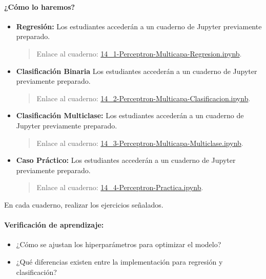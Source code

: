 \documentclass[a4,11pt]{aleph-notas}
\begin{document}
\paragraph{¿Cómo lo haremos?}  
\begin{itemize}[leftmargin=*]
    \item \textbf{Regresión:} Los estudiantes accederán a un cuaderno de Jupyter previamente preparado.
    \begin{quote}
        Enlace al cuaderno: \href{https://colab.research.google.com/github/andres-merino/AprendizajeAutomaticoInicial-05-N0105/blob/main/2-Notebooks/14_1-Perceptron-Multicapa-Regresion.ipynb}{14\_1-Perceptron-Multicapa-Regresion.ipynb}.
    \end{quote}
    \item \textbf{Clasificación Binaria} Los estudiantes accederán a un cuaderno de Jupyter previamente preparado.
    \begin{quote}
        Enlace al cuaderno: \href{https://colab.research.google.com/github/andres-merino/AprendizajeAutomaticoInicial-05-N0105/blob/main/2-Notebooks/14_2-Perceptron-Multicapa-Clasificacion.ipynb}{14\_2-Perceptron-Multicapa-Clasificacion.ipynb}.
    \end{quote}
    \item \textbf{Clasificación Multiclase:} Los estudiantes accederán a un cuaderno de Jupyter previamente preparado.
    \begin{quote}
        Enlace al cuaderno: \href{https://colab.research.google.com/github/andres-merino/AprendizajeAutomaticoInicial-05-N0105/blob/main/2-Notebooks/14_3-Perceptron-Multicapa-Multiclase.ipynb}{14\_3-Perceptron-Multicapa-Multiclase.ipynb}.
    \end{quote}
    \item \textbf{Caso Práctico:} Los estudiantes accederán a un cuaderno de Jupyter previamente preparado.
    \begin{quote}
        Enlace al cuaderno: \href{https://colab.research.google.com/github/andres-merino/AprendizajeAutomaticoInicial-05-N0105/blob/main/2-Notebooks/14_4-Perceptron-Practica.ipynb}{14\_4-Perceptron-Practica.ipynb}.
    \end{quote}
\end{itemize}

\begin{ejer}
En cada cuaderno, realizar los ejercicios señalados.
\end{ejer}

\paragraph{Verificación de aprendizaje:}  
\begin{itemize}[leftmargin=*]
    \item ¿Cómo se ajustan los hiperparámetros para optimizar el modelo?
    \item ¿Qué diferencias existen entre la implementación para regresión y clasificación?
\end{itemize}
\end{document}
